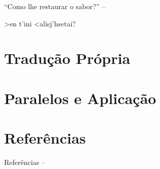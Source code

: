 \documentclass[12pt,aspectratio=169]{beamer}
\newcommand{\BRI}[1]{{\textcolor{BSpbg}{#1}}}   %
\newcommand{\GRtxt}[1]{\begin{otherlanguage}{greek}{{#1}}\end{otherlanguage}}
\begin{document}
    \begin{frame}{\BRI{``Como lhe restaurar o sabor?''} -- \GRtxt{>en t'ini <alisj'hsetai?}}
    \end{frame}

\section{Tradução Própria}

\section{Paralelos e Aplicação}

\section{Referências}

    \begin{frame}[allowframebreaks]{Referências -- }
        
        
    \end{frame}

\end{document}

